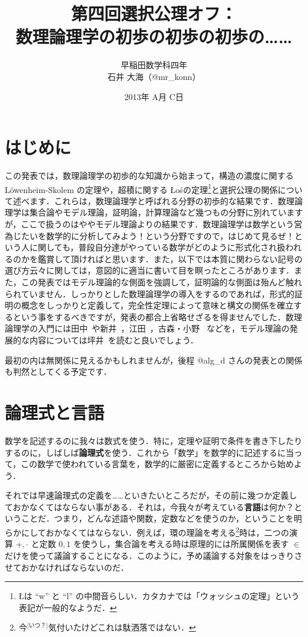 \documentclass[a4j,xelatex,ja=standard]{ltjsarticle}
\title{第四回選択公理オフ：\\数理論理学の初歩の初歩の初歩の……}
\author{早稲田数学科四年\\石井 大海（@mr\_konn）}
\date{2013年 A月 C日}
\newcommand{\Los}{{\L}o\'{s}}
\begin{document}
\maketitle

\section{はじめに}
この発表では，数理論理学の初歩的な知識から始まって，構造の濃度に関する L\"{o}wenheim-Skolem の定理や，超積に関する \Los の定理\footnote{\L は ``w'' と ``l'' の中間音らしい．カタカナでは「ウォッシュの定理」という表記が一般的なようだ．}と選択公理の関係について述べます．これらは，数理論理学と呼ばれる分野の初歩的な結果です．数理論理学は集合論やモデル理論，証明論，計算理論など幾つもの分野に別れていますが，ここで扱うのはややモデル理論よりの結果です．数理論理学は数学という営為じたいを数学的に分析してみよう！という分野ですので，はじめて見るぜ！という人に関しても，普段自分達がやっている数学がどのように形式化され扱われるのかを鑑賞して頂ければと思います．また，以下では本質に関わらない記号の選び方云々に関しては，意図的に適当に書いて目を瞑ったところがあります．また，この発表ではモデル理論的な側面を強調して，証明論的な側面は殆んど触れられていません．しっかりとした数理論理学の導入をするのであれば，形式的証明の概念をしっかりと定義して，完全性定理によって意味と構文の関係を確立するという事をするべきですが，発表の都合上省略せざるを得ませんでした．数理論理学の入門には田中~\cite{Tanaka}や新井~\cite{Arai}，江田~\cite{Eda}，古森・小野~\cite{Komori} などを，モデル理論の発展的な内容については坪井~\cite{Tsuboi}を読むと良いでしょう．

最初の内は無関係に見えるかもしれませんが，後程 @alg\_d さんの発表との関係も判然としてくる予定です．

\section{論理式と言語}
数学を記述するのに我々は数式を使う．特に，定理や証明で条件を書き下したりするのに，しばしば{\bfseries 論理式}を使う．これから「数学」を数学的に記述するに当って，この数学で使われている言葉を，数学的に厳密に定義するところから始めよう．

それでは早速論理式の定義を……といきたいところだが，その前に幾つか定義しておかなくてはならない事がある．それは，今我々が考えている{\bfseries 言語}は何か？ということだ．つまり，どんな述語や関数，定数などを使うのか，ということを明らかにしておかなくてはならない．例えば，環の理論を考える\footnote{今$^{\text{[いつ？]}}$気付いたけどこれは駄洒落ではない．}時は，二つの演算 $+, \cdot$ と定数 $0, 1$ を使うし，集合論を考える時は原理的には所属関係を表す $\in$ だけを使って議論することになる．このように，予め議論する対象をはっきりさせておかなければならないのだ．
\end{document}
